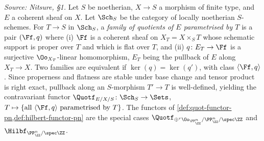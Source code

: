 \begin{definition}
  \label{def:quot-functor}
  \textit{Source: Nitsure, §1.}
  Let $S$ be noetherian, $X\to S$ a morphism of finite type, and $E$ a coherent
  sheaf on $X$. Let $\Sch_S$ be the category of locally noetherian $S$-schemes.
  For $T\to S$ in $\Sch_S$, a \emph{family of quotients of $E$ parametrised by
  $T$} is a pair $(\Ff,q)$ where (i) $\Ff$ is a coherent sheaf on $X_T =
  X\times_S T$ whose schematic support is proper over $T$ and which is flat over
  $T$, and (ii) $q\colon E_T\to\Ff$ is a surjective $\Oo_{X_T}$-linear
  homomorphism, $E_T$ being the pullback of $E$ along $X_T\to X$. Two families are
  equivalent if $\ker(q) = \ker(q')$, with class $\langle\Ff,q\rangle$. Since
  properness and flatness are stable under base change and tensor product is
  right exact, pullback along an $S$-morphism $T'\to T$ is well-defined, yielding
  the contravariant functor $\Quotf_{E/X/S}\colon\Sch_S\to\Sets$,
  $T\mapsto\{\text{all }\langle\Ff,q\rangle \text{ parametrised by } T\}$. The
  functors of \cref{def:quot-functor-pn,def:hilbert-functor-pn} are the special
  cases $\Quotf_{\oplus^r\Oo_{\PP^n_{\ZZ}}/\PP^n_{\ZZ}/\spec\ZZ}$ and
  $\Hilbf_{\PP^n_{\ZZ}/\spec\ZZ}$.
\end{definition}

